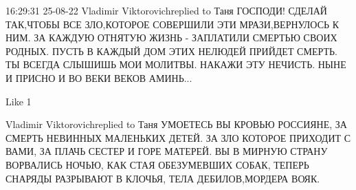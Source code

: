  
 
 
 
 

16:29:31 25-08-22
Vladimir Viktorovichreplied to Таня
ГОСПОДИ! СДЕЛАЙ ТАК,ЧТОБЫ ВСЕ ЗЛО,КОТОРОЕ СОВЕРШИЛИ ЭТИ МРАЗИ,ВЕРНУЛОСЬ К НИМ.                         ЗА КАЖДУЮ ОТНЯТУЮ ЖИЗНЬ - ЗАПЛАТИЛИ СМЕРТЬЮ СВОИХ РОДНЫХ.                                                                       ПУСТЬ В КАЖДЫЙ ДОМ ЭТИХ НЕЛЮДЕЙ ПРИЙДЕТ СМЕРТЬ.                                                                                           ТЫ ВСЕГДА СЛЫШИШЬ МОИ МОЛИТВЫ. НАКАЖИ ЭТУ НЕЧИСТЬ. НЫНЕ И ПРИСНО И ВО ВЕКИ ВЕКОВ АМИНЬ...

    Like 1

Vladimir Viktorovichreplied to Таня
УМОЕТЕСЬ ВЫ КРОВЬЮ РОССИЯНЕ,                                   ЗА СМЕРТЬ НЕВИННЫХ МАЛЕНЬКИХ ДЕТЕЙ.                     ЗА ЗЛО КОТОРОЕ ПРИХОДИТ С ВАМИ,                                 ЗА ПЛАЧЬ СЕСТЕР И ГОРЕ МАТЕРЕЙ.                                  ВЫ В МИРНУЮ СТРАНУ ВОРВАЛИСЬ НОЧЬЮ,                       КАК СТАЯ ОБЕЗУМЕВШИХ СОБАК,                                        ТЕПЕРЬ СНАРЯДЫ РАЗРЫВАЮТ В КЛОЧЬЯ,                    ТЕЛА ДЕБИЛОВ,МОРДЕРА ВОЯК.
